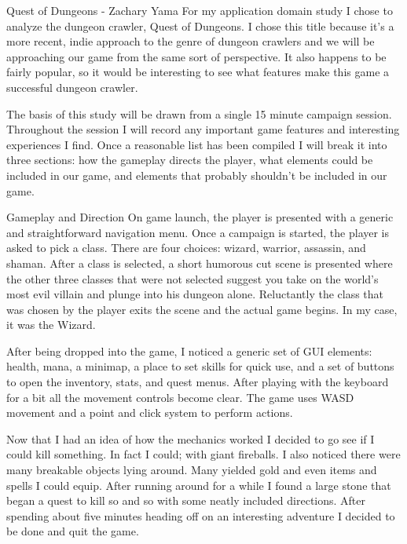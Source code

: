 \documentclass[12pt]{report}
\begin{document}
\begin{section}{Quest of Dungeons - Zachary Yama}
For my application domain study I chose to analyze the dungeon crawler, Quest of Dungeons. 
I chose this title because it’s a more recent, indie approach to the genre of dungeon crawlers 
and we will be approaching our game from the same sort of perspective. It also happens to be 
fairly popular, so it would be interesting to see what features make this game a successful 
dungeon crawler.
 
The basis of this study will be drawn from a single 15 minute campaign session. Throughout the 
session I will record any important game features and interesting experiences I find. Once a 
reasonable list has been compiled I will break it into three sections: how the gameplay directs 
the player, what elements could be included in our game, and elements that probably shouldn’t 
be included in our game.
 
\begin{subsection}{Gameplay and Direction}
On game launch, the player is presented with a generic and straightforward navigation menu. 
Once a campaign is started, the player is asked to pick a class. There are four choices: wizard, 
warrior, assassin, and shaman. After a class is selected, a short humorous cut scene is presented 
where the other three classes that were not selected suggest you take on the world’s most evil 
villain and plunge into his dungeon alone. Reluctantly the class that was chosen by the player 
exits the scene and the actual game begins. In my case, it was the Wizard.
 
After being dropped into the game, I noticed a generic set of GUI elements: health, mana, a 
minimap, a place to set skills for quick use, and a set of buttons to open the inventory, stats, 
and quest menus. After playing with the keyboard for a bit all the movement controls become clear. 
The game uses WASD movement and a point and click system to perform actions.
 
Now that I had an idea of how the mechanics worked I decided to go see if I could kill something. 
In fact I could; with giant fireballs. I also noticed there were many breakable objects lying 
around. Many yielded gold and even items and spells I could equip. After running around for a 
while I found a large stone that began a quest to kill so and so with some neatly included 
directions. After spending about five minutes heading off on an interesting adventure I decided 
to be done and quit the game.
 

\end{subsection}
\end{section}
\end{document}

